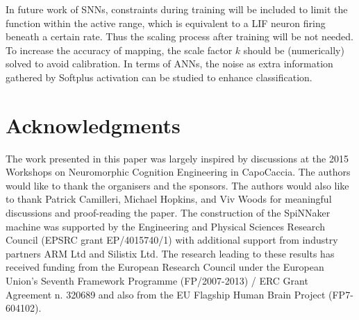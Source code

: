 \documentclass[runningheads,a4paper]{llncs}
\begin{document}
In future work of SNNs, constraints during training will be included to limit the function within the active range, which is equivalent to a LIF neuron firing beneath a certain rate.
Thus the scaling process after training will be not needed.
To increase the accuracy of mapping, the scale factor $k$ should be (numerically) solved to avoid calibration.
In terms of ANNs, the noise as extra information gathered by Softplus activation can be studied to enhance classification.


\section*{Acknowledgments}

The work presented in this paper was largely inspired by discussions at the 2015 Workshops on Neuromorphic Cognition Engineering in CapoCaccia.
The authors would like to thank the organisers and the sponsors.
The authors would also like to thank Patrick Camilleri, Michael Hopkins, and Viv Woods for meaningful discussions and proof-reading the paper.
The construction of the SpiNNaker machine was supported by the Engineering and Physical Sciences Research Council (EPSRC grant EP/4015740/1) with additional support from industry partners ARM Ltd and Silistix Ltd.
The research leading to these results has received funding from the European Research Council under the European Union's Seventh Framework Programme (FP/2007-2013) / ERC Grant Agreement n. 320689 and also from the EU Flagship Human Brain Project (FP7-604102). 
\end{document}
